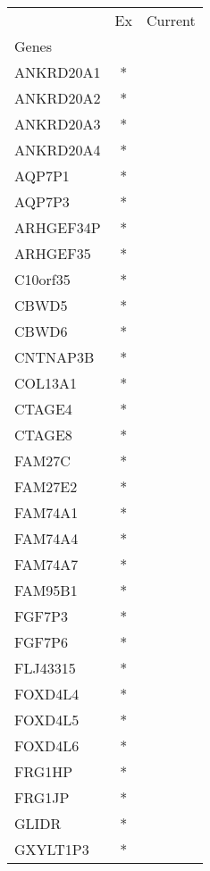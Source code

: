 \begin{tabular}{lcc}
\toprule
{} & Ex & Current \\
Genes              &    &         \\
\midrule
ANKRD20A1          &  * &         \\
ANKRD20A2          &  * &         \\
ANKRD20A3          &  * &         \\
ANKRD20A4          &  * &         \\
AQP7P1             &  * &         \\
AQP7P3             &  * &         \\
ARHGEF34P          &  * &         \\
ARHGEF35           &  * &         \\
C10orf35           &  * &         \\
CBWD5              &  * &         \\
CBWD6              &  * &         \\
CNTNAP3B           &  * &         \\
COL13A1            &  * &         \\
CTAGE4             &  * &         \\
CTAGE8             &  * &         \\
FAM27C             &  * &         \\
FAM27E2            &  * &         \\
FAM74A1            &  * &         \\
FAM74A4            &  * &         \\
FAM74A7            &  * &         \\
FAM95B1            &  * &         \\
FGF7P3             &  * &         \\
FGF7P6             &  * &         \\
FLJ43315           &  * &         \\
FOXD4L4            &  * &         \\
FOXD4L5            &  * &         \\
FOXD4L6            &  * &         \\
FRG1HP             &  * &         \\
FRG1JP             &  * &         \\
GLIDR              &  * &         \\
GXYLT1P3           &  * &         \\

\end{tabular}
